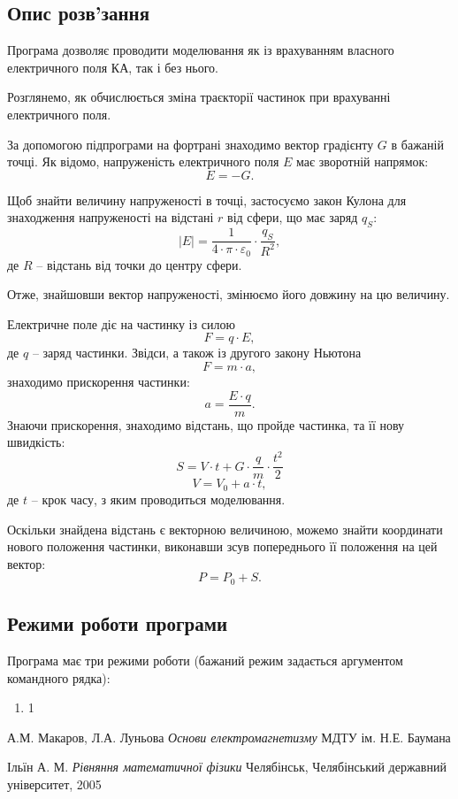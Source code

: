 \documentclass[a4paper,12pt]{article}
\begin{document}
\subsection{Опис розв’зання}
Програма дозволяє проводити моделювання як із врахуванням власного електричного поля КА, так і без нього.

Розглянемо, як обчислюється зміна траєкторії частинок при врахуванні електричного поля.

За допомогою підпрограми на фортрані знаходимо вектор градієнту $G$ в бажаній точці. Як відомо, напруженість електричного поля $E$ має зворотній напрямок:
\[
E = -G.
\]

Щоб знайти величину напруженості в точці, застосуємо закон Кулона для знаходження напруженості на відстані $r$ від сфери, що має заряд $q_S$:
\[
|E| = \frac{1}{4 \cdot \pi \cdot \varepsilon_0} \cdot \frac{q_S}{R^2},
\]
де $R$ -- відстань від точки до центру сфери.

Отже, знайшовши вектор напруженості, змінюємо його довжину на цю величину.

Електричне поле діє на частинку із силою
\[
F = q \cdot E,
\]
де $q$ -- заряд частинки.
Звідси, а також із другого закону Ньютона
\[
F = m \cdot a,
\]
знаходимо прискорення частинки:
\[
a = \frac{E \cdot q}{m}.
\]
Знаючи прискорення, знаходимо відстань, що пройде частинка, та її нову швидкість:
\[
S = V \cdot t + G \cdot \frac{q}{m} \cdot \frac{t^2}{2}
\]
\[
V = V_{0} + a \cdot t,
\]
де $t$ -- крок часу, з яким проводиться моделювання.

Оскільки знайдена відстань є векторною величиною, можемо знайти координати нового положення частинки, виконавши зсув попереднього її положення на цей вектор:
\[
P = P_0 + S.
\]

\subsection{Режими роботи програми}
Програма має три режими роботи (бажаний режим задається аргументом командного рядка):
\begin{enumerate}
\item 1
\end{enumerate}



\begin{thebibliography}{9}

    А.М. Макаров, Л.А. Луньова
    \emph{Основи електромагнетизму}
    МДТУ ім. Н.Е. Баумана  
      
	Ільїн А. М.
	\emph{Рівняння математичної фізики}
	Челябінськ, Челябінський державний університет, 2005
	


\end{thebibliography}
\end{document}
